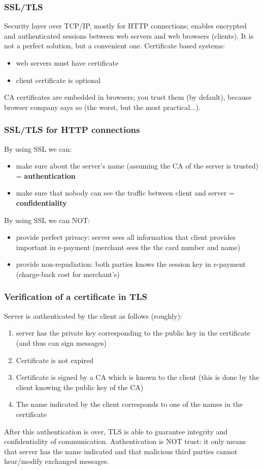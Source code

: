 \documentclass[a4paper, 10pt, titlepage]{article}
\begin{document}
\subsubsection{SSL/TLS}
\label{section:tls1}
Security layer over TCP/IP, mostly for HTTP connections; enables encrypted and authenticated sessions between web servers and web browsers (clients). It is not a perfect solution, but a convenient one. Certificate based systems:
\begin{itemize}
\item web servers must have certificate
\item client certificate is optional
\end{itemize}
CA certificates are embedded in browsers; you trust them (by default), because browser company says so (the worst, but the most practical...).
\subsubsection{SSL/TLS for HTTP connections}
\label{section:tls2}
By using SSL we can:
\begin{itemize}
\item make sure about the server’s name (assuming the CA of the server is trusted) = \textbf{authentication}
\item make sure that nobody can see the traffic between client and server = \textbf{confidentiality}
\end{itemize}
By using SSL we can NOT:
\begin{itemize}
\item provide perfect privacy: server sees all information that client provides important in e-payment (merchant sees the the card number and name)
\item provide non-repudiation: both parties knows the session key
in e-payment (charge-back cost for merchant’s)
\end{itemize}
\subsubsection{Verification of a certificate in TLS}
\label{section:tls3}
Server is authenticated by the client as follows (roughly): 
\begin{enumerate}
\item server has the private key corresponding to the public key in the certificate (and thus can sign messages)
\item Certificate is not expired
\item Certificate is signed by a CA which is known to the client (this is done by the client knowing the public key of the CA)
\item The name indicated by the client corresponds to one of the names in the certificate
\end{enumerate}
After this authentication is over, TLS is able to guarantee integrity and confidentiality of communication. Authentication is NOT trust: it only means that server has the name indicated and that malicious third parties cannot hear/modify exchanged messages.
\end{document}
